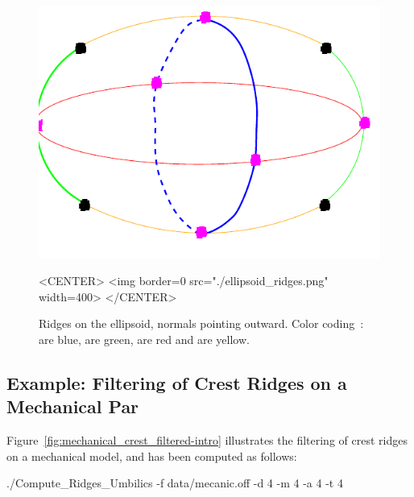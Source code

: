 \begin{figure}[!ht]
\begin{ccTexOnly}
\centerline{
\includegraphics[width=.5\linewidth]{Ridges_3/ellipsoid_ridges}}
\end{ccTexOnly}

\begin{ccHtmlOnly}
<CENTER> <img border=0 src="./ellipsoid_ridges.png" width=400>
</CENTER>
\end{ccHtmlOnly}
\caption{Ridges on the ellipsoid, normals pointing outward.
 Color coding~:  are blue,
 are green,  are red and 
 are yellow. }
\label{ellipsoid-ridges-example}
\end{figure}

\subsection{Example: Filtering of Crest Ridges on a Mechanical Par}

Figure~\ref{fig:mechanical_crest_filtered-intro} illustrates the filtering 
of crest ridges on a mechanical model, and has been computed as follows:
\begin{ccExampleCode}
./Compute_Ridges_Umbilics -f data/mecanic.off -d 4 -m 4 -a 4 -t 4
\end{ccExampleCode}

